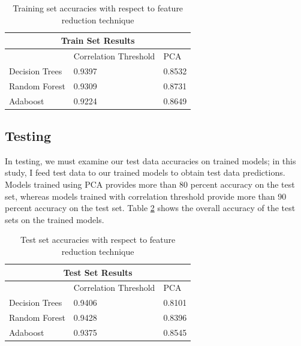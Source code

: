 \documentclass[12pt]{article}
\begin{document}
\begin{table}[h!]
	\centering
\begin{tabular}{ |p{3cm}|p{3cm}|p{3cm}|  }
	\hline
	\multicolumn{3}{|c|}{Train Set Results} \\
	\hline
	& Correlation Threshold & PCA \\
	\hline
	Decision Trees & 0.9397 &0.8532 \\
	Random Forest & 0.9309   & 0.8731 \\
	Adaboost &0.9224 & 0.8649 \\
	\hline
\end{tabular}
\caption{Training set accuracies with respect to feature reduction technique}
\label{table:accuracies}
\end{table}


\subsection{Testing}
In testing, we must examine our test data accuracies on trained models; in this study, I feed test data to our trained models to obtain test data predictions. Models trained using PCA provides more than 80 percent accuracy on the test set, whereas models trained with correlation threshold provide more than 90 percent accuracy on the test set. Table \ref{table:test_accuracies} shows the overall accuracy of the test sets on the trained models.
\begin{table}[h!]
	\centering
	\begin{tabular}{ |p{3cm}|p{3cm}|p{3cm}|  }
		\hline
		\multicolumn{3}{|c|}{Test Set Results} \\
		\hline
		& Correlation Threshold & PCA \\
		\hline
		Decision Trees & 0.9406 &0.8101 \\
		Random Forest & 0.9428   & 0.8396 \\
		Adaboost &0.9375 & 0.8545 \\
		\hline
	\end{tabular}
	\caption{Test set accuracies with respect to feature reduction technique}
	\label{table:test_accuracies}
\end{table}
\end{document}
